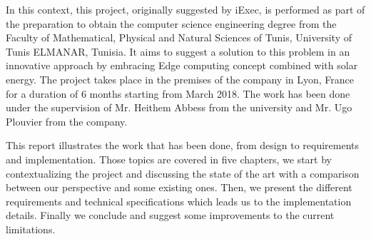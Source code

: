 In this context, this project, originally suggested by iExec, is performed as part of the
preparation to obtain the computer science engineering degree from the Faculty of Mathematical,
Physical and Natural Sciences of Tunis, University of Tunis ELMANAR, Tunisia. It aims to suggest a
solution to this problem in an innovative approach by embracing Edge computing concept combined
with solar energy. The project takes place in the premises of the company in Lyon, France for a
duration of 6 months starting from March 2018. The work has been done under the supervision of
Mr. Heithem Abbess from the university and Mr. Ugo Plouvier from the company.

This report
illustrates the work that has been done, from design to requirements and implementation. Those topics
are covered in five chapters, we start by contextualizing the project and discussing the state of the
art with a comparison between our perspective and some existing ones. Then, we present the different
requirements and technical specifications which leads us to the implementation details. Finally we
conclude and suggest some improvements to the current limitations.
